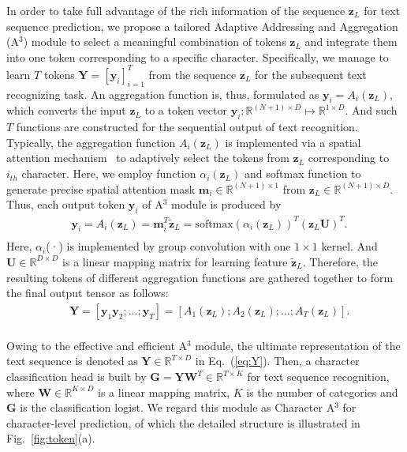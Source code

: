 \documentclass[runningheads]{llncs}
\begin{document}
In order to take full advantage of the rich information of the sequence $ \mathbf{z}_{L} $ for text sequence prediction, 
we propose a tailored Adaptive Addressing and Aggregation (A$^3$)  module to select a  meaningful combination of tokens $ \mathbf{z}_{L} $ and integrate them into one token corresponding to a specific character.
Specifically, we manage to learn $T$ tokens $\mathbf{Y} = [\mathbf{y}_i]_{i=1}^{T}$ from the sequence $ \mathbf{z}_{L} $ for the subsequent text recognizing task.
An aggregation function is, thus, formulated as $\mathbf{y}_i = A_i(\mathbf{z}_{L})$, which converts the input  $ \mathbf{z}_{L} $ to a token vector $\mathbf{y}_i: \mathbb{R}^{ (N+1) \times D}  \mapsto  \mathbb{R}^{ 1 \times D } $. And  such $ T $ functions are constructed for the sequential output of text recognition.
Typically, the aggregation function $A_i(\mathbf{z}_{L})$ is implemented via a spatial attention mechanism~\cite{tokenlearner} to adaptively select the tokens from $ \mathbf{z}_{L} $ corresponding  to $i_{th}$ character.
Here, we employ function $\alpha_i(\mathbf{z}_{L})$ and softmax function to generate precise spatial attention 
mask $\mathbf{m}_i \in  \mathbb{R}^{ (N+1) \times 1}  $ from $\mathbf{z}_{L} \in \mathbb{R}^{ (N+1) \times D}$.
Thus, each output token $\mathbf{y}_i $ of A$^3$ module is produced by 
\begin{equation}
\begin{split}
&\mathbf{y}_{i}= A_i(\mathbf{z}_{L}) = \mathbf{m}_i^T \tilde{\mathbf{z}}_{L}  = \text{softmax}(\alpha_i(\mathbf{z}_{L}))^T (\mathbf{z}_{L}\mathbf{U})^T.\\
\end{split}
\end{equation}
Here, $\alpha_i$(·) is implemented by group convolution with one $1 \times 1$ kernel. And $ \mathbf{U}\in \mathbb{R}^{ D \times D}$  is a linear mapping matrix for learning feature $ \tilde{\mathbf{z}}_{L}$. Therefore, the resulting tokens of different aggregation functions are gathered together to form the final output tensor as follows:
\begin{equation}
\label{eq:Y}
\begin{split}
&\mathbf{Y}= [\mathbf{y}_{1}\mathbf{y}_{2};\ldots;\mathbf{y}_{T}] = [A_1(\mathbf{z}_{L}); A_2(\mathbf{z}_{L}); \ldots ;A_T(\mathbf{z}_{L}) ].\\
\end{split}
\end{equation}

Owing to the effective and efficient  A$^3$ module, the ultimate
representation of the text sequence is denoted as $\mathbf{Y} \in \mathbb{R}^{ T \times D}$ in Eq.~(\ref{eq:Y}). Then, a character classification head is built by $ \mathbf{G} = \mathbf{YW}^T \in \mathbb{R}^{ T \times K} $ for text sequence recognition, where $\mathbf{W} \in \mathbb{R}^{ K \times D}$ is a linear mapping matrix, $K$ is the number of categories and $ \mathbf{G} $ is the classification logist. 
We regard this module as Character  A$^3$ for character-level prediction, of which the detailed structure is illustrated in Fig.~\ref{fig:token}(a). 
\end{document}
